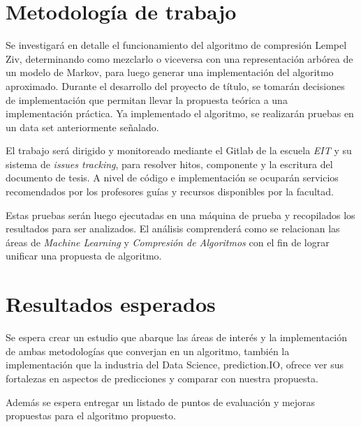 \documentclass{udparticle}
\begin{document}
\section{Metodología de trabajo}

Se investigará en detalle el funcionamiento del algoritmo de compresión Lempel Ziv, determinando como mezclarlo o viceversa con una representación arbórea de un modelo de Markov, para luego generar una implementación del algoritmo aproximado.
Durante el desarrollo del proyecto de título, se tomarán decisiones de implementación que permitan llevar la propuesta teórica a una implementación práctica. Ya implementado el algoritmo, se realizarán pruebas en un data set anteriormente señalado.

El trabajo será dirigido y monitoreado mediante el Gitlab de la escuela \emph{EIT} y su sistema de \emph{issues tracking}, para resolver hitos, componente y la escritura del documento de tesis. A nivel de código e implementación se ocuparán servicios recomendados por los profesores guías y recursos disponibles por la facultad.

Estas pruebas serán luego ejecutadas en una máquina de prueba y recopilados los resultados para ser analizados.
El análisis comprenderá como se relacionan las áreas de \emph{Machine Learning} y \emph{Compresión de Algoritmos} con el fin de lograr unificar una propuesta de algoritmo. 

\section{Resultados esperados}

Se espera crear un estudio que abarque las áreas de interés y la implementación de ambas metodologías que converjan en un algoritmo, 
también la implementación que la industria del Data Science, prediction.IO, ofrece ver sus fortalezas en aspectos de predicciones y comparar con nuestra propuesta.

Además se espera entregar un listado de puntos de evaluación y mejoras propuestas para el algoritmo propuesto.

\newpage
\end{document}
